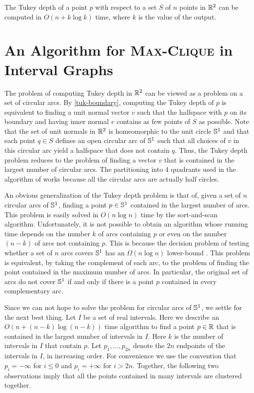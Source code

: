 \documentclass[charterfonts,lotsofwhite]{patmorin}
\begin{document}
\begin{thm}
The Tukey depth of a point $p$ with respect to a set $S$ of $n$ points
in $\mathbb{R}^2$ can be computed in $O(n + k\log k)$ time, where
$k$ is the value of the output.
\end{thm}

\section{An Algorithm for \textsc{Max-Clique} in Interval Graphs}

The problem of computing Tukey depth in $\mathbb{R}^2$ can be viewed as a
problem on a set of circular arcs.  By \eqref{tuk-boundary}, computing
the Tukey depth of $p$ is equivalent to finding a unit normal vector
$v$ such that the halfspace with $p$ on its boundary and having inner
normal $v$ contains as few points of $S$ as possible.  Note that the
set of unit normals in $\mathbb{R}^2$ is homeomorphic to the unit circle
$\mathbb{S}^1$ and that each point $q\in S$ defines an open circular arc of $\mathbb{S}^1$
such that all choices of $v$ in this circular arc yield a halfspace
that does not contain $q$.  Thus, the Tukey depth problem reduces to
the problem of finding a vector $v$ that is contained in the largest
number of circular arcs. The partitioning into 4 quadrants used in
the algorithm of  works because all the circular arcs are
actually half circles.

An obvious generalization of the Tukey depth problem is that of, given
a set of $n$ circular arcs of $\mathbb{S}^1$, finding a point $p\in\mathbb{S}^1$
contained in the largest number of arcs.  This problem is easily
solved in $O(n\log n)$ time by the sort-and-scan algorithm.
Unfortunately, it is not possible to obtain an algorithm whose running
time depends on the number $k$ of arcs containing $p$ or even on the
number $(n-k)$ of arcs not containing $p$.  This is because the
decision problem of testing whether a set of $n$ arcs covers $\mathbb{S}^1$
has an $\Omega(n\log n)$ lower-bound \cite{b-o83}.  This problem is
equivalent, by taking the complement of each arc, to the problem of
finding the point contained in the maximum number of arcs.  In
particular, the original set of arcs do not cover $\mathbb{S}^1$ if and only
if there is a point $p$ contained in every complementary arc.

Since we can not hope to solve the problem for circular arcs of
$\mathbb{S}^1$, we settle for the next best thing.  Let $I$ be a set of real
intervals.  Here we describe an $O(n+(n-k)\log (n-k))$ time algorithm
to find a point $p\in\mathbb{R}$ that is contained in the largest number of
intervals in $I$.  Here $k$ is the number of intervals in $I$ that
contain $p$.  Let $p_1,\ldots,p_{2n}$ denote the $2n$ endpoints of the
intervals in $I$, in increasing order.  For convenience we use the
convention that $p_i = -\infty$ for $i\le 0$ and $p_i=+\infty$ for $i
> 2n$.  Together, the following two observations imply that all the
points contained in many intervals are clustered together.
\end{document}
